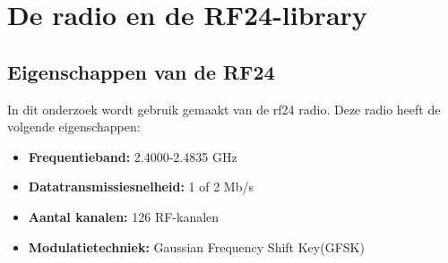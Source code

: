 \documentclass{article}
\begin{document}
\clearpage





\newpage
\appendix
\section{De radio en de RF24-library}
\subsection{Eigenschappen van de RF24}
In dit onderzoek wordt gebruik gemaakt van de rf24 radio. Deze radio heeft de volgende eigenschappen:
	\begin{itemize}	
	\item\textbf{Frequentieband: }2.4000-2.4835 GHz
	\item\textbf{Datatransmissiesnelheid: }1 of 2 Mb/s
	\item\textbf{Aantal kanalen: }126 RF-kanalen
	\item\textbf{Modulatietechniek: }Gaussian Frequency Shift Key(GFSK)
	\end{itemize}
	
\end{document}
